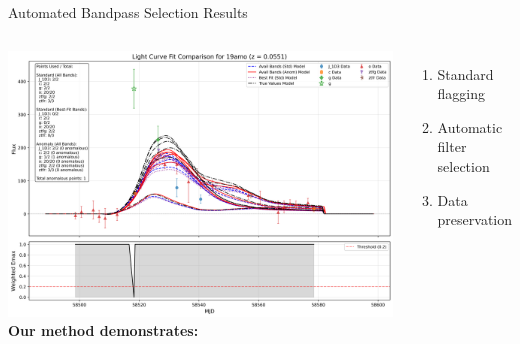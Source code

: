\documentclass[aspectratio=169]{beamer}
\begin{document}
\begin{frame}{Automated Bandpass Selection Results}
  \begin{columns}
      \includegraphics[width=1\textwidth]{images/light_curve_comparison_19amo.png}
      \textbf{Our method demonstrates:}
      \begin{enumerate}
        \item Standard flagging
        \item Automatic filter selection
        \item Data preservation
      \end{enumerate}
  \end{columns}
\end{frame}
\end{document}
